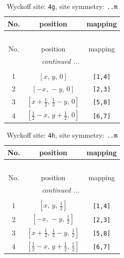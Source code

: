 \documentclass[fleqn,8pt]{jsarticle}
\begin{document}
\renewcommand{\arraystretch}{1.2}
\begin{longtable}{ccc}
\caption{Wyckoff site: {\tt 4g}, site symmetry: {\tt ..m}}
 \\
 \hline \hline
No. & position & mapping \\ \hline \endfirsthead

\multicolumn{2}{l}{\tablename\ \thetable{}} \\
 \hline \hline
No. & position & mapping \\ \hline \endhead

 \hline \hline
\multicolumn{2}{r}{\footnotesize\it continued ...} \\ \endfoot

 \hline \hline
\multicolumn{2}{r}{} \\ \endlastfoot

1 & $\left[ x,\, y,\, 0 \right]$ & {\tt [1,4]} \\ \hline
2 & $\left[ - x,\, - y,\, 0 \right]$ & {\tt [2,3]} \\ \hline
3 & $\left[ x + \frac{1}{2},\, \frac{1}{2} - y,\, 0 \right]$ & {\tt [5,8]} \\ \hline
4 & $\left[ \frac{1}{2} - x,\, y + \frac{1}{2},\, 0 \right]$ & {\tt [6,7]} \\
\end{longtable}
\renewcommand{\arraystretch}{1.2}
\begin{longtable}{ccc}
\caption{Wyckoff site: {\tt 4h}, site symmetry: {\tt ..m}}
 \\
 \hline \hline
No. & position & mapping \\ \hline \endfirsthead

\multicolumn{2}{l}{\tablename\ \thetable{}} \\
 \hline \hline
No. & position & mapping \\ \hline \endhead

 \hline \hline
\multicolumn{2}{r}{\footnotesize\it continued ...} \\ \endfoot

 \hline \hline
\multicolumn{2}{r}{} \\ \endlastfoot

1 & $\left[ x,\, y,\, \frac{1}{2} \right]$ & {\tt [1,4]} \\ \hline
2 & $\left[ - x,\, - y,\, \frac{1}{2} \right]$ & {\tt [2,3]} \\ \hline
3 & $\left[ x + \frac{1}{2},\, \frac{1}{2} - y,\, \frac{1}{2} \right]$ & {\tt [5,8]} \\ \hline
4 & $\left[ \frac{1}{2} - x,\, y + \frac{1}{2},\, \frac{1}{2} \right]$ & {\tt [6,7]} \\
\end{longtable}
\end{document}
